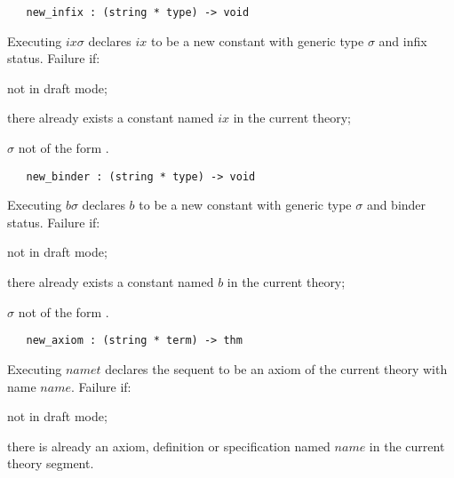 \begin{boxed}
\begin{verbatim}
   new_infix : (string * type) -> void
\end{verbatim}\end{boxed}


\noindent Executing $ix$$\sigma$\ml{)}
declares $ix$ to be a new constant with generic type $\sigma$ and
infix status.
Failure if:
\begin{myenumerate}
\item not in draft mode;
\item there already exists a constant named $ix$ in the current theory;
\item $\sigma$ not of the form .
\end{myenumerate}


\begin{boxed}
\begin{verbatim}
   new_binder : (string * type) -> void
\end{verbatim}\end{boxed}


\noindent Executing $b$$\sigma$\ml{)}
declares $b$ to be a new constant with generic type $\sigma$ and
binder status.
Failure if:
\begin{myenumerate}
\item not in draft mode;
\item there already exists a constant named $b$ in the current theory;
\item $\sigma$ not of the form .
\end{myenumerate}

\begin{boxed}
\begin{verbatim}
   new_axiom : (string * term) -> thm
\end{verbatim}\end{boxed}


\noindent Executing $name$$t$\ml{)} declares the
sequent
 to be an axiom of the current theory with name $name$.
Failure if:
\begin{myenumerate}
\item not in draft mode;
\item there is already an axiom, definition or specification
named $name$ in the current theory segment.
\end{myenumerate}


